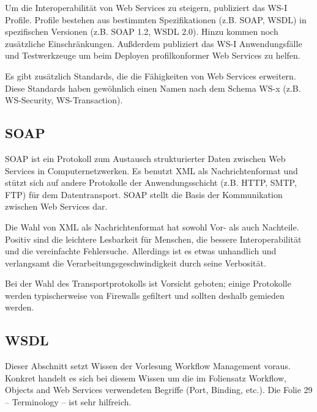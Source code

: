 \documentclass[runningheads]{llncs}
\newcommand{\germanquote}[1]{\glqq{}#1\grqq{}}
\begin{document}
    Um die Interoperabilität von Web Services zu steigern, publiziert das WS-I\cite{wsi_hp} Profile. Profile bestehen aus bestimmten Spezifikationen (z.B. SOAP, WSDL) in spezifischen Versionen (z.B. SOAP 1.2, WSDL 2.0). Hinzu kommen noch zusätzliche Einschränkungen. Außderdem publiziert das WS-I Anwendungsfälle und Testwerkzeuge um beim Deployen profilkonformer Web Services zu helfen.

    Es gibt zusätzlich Standards, die die Fähigkeiten von Web Services erweitern. Diese Standards haben gewöhnlich einen Namen nach dem Schema \germanquote{WS-x} (z.B. WS-Security, WS-Transaction). %

  \label{soap}
  \subsection{SOAP}
  \nocite{wk_soap}
    SOAP ist ein Protokoll zum Austausch strukturierter Daten zwischen Web Services in Computernetzwerken. Es benutzt XML als Nachrichtenformat und stützt sich auf andere Protokolle der Anwendungsschicht (z.B. HTTP, SMTP, FTP) für dem Datentransport. SOAP stellt die Basis der Kommunikation zwischen Web Services dar.

    Die Wahl von XML als Nachrichtenformat hat sowohl Vor- als auch Nachteile.
    Positiv sind die leichtere Lesbarkeit für Menschen, die bessere Interoperabilität und die vereinfachte Fehlersuche. Allerdings ist es etwas unhandlich und verlangsamt die Verarbeitungsgeschwindigkeit durch seine Verbosität.

    Bei der Wahl des Transportprotokolls ist Vorsicht geboten; einige Protokolle werden typischerweise von Firewalls gefiltert und sollten deshalb gemieden werden.

  \subsection{WSDL}
  \label{wsdl}
  \nocite{wk_wsdl}
    Dieser Abschnitt setzt Wissen der Vorlesung \germanquote{Workflow Management}\cite{wfm_site} voraus. Konkret handelt es sich bei diesem Wissen um die im Foliensatz \germanquote{Workflow, Objects and Web Services}\cite{wfm_ch7} verwendeten Begriffe (Port, Binding, etc.). Die Folie 29 -- Terminology -- ist sehr hilfreich.
\end{document}
